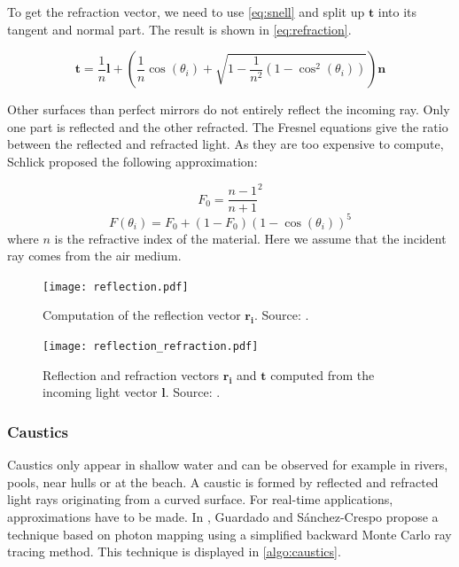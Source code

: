 To get the refraction vector, we need to use \autoref{eq:snell} and split up
$\textbf{t}$ into its tangent and normal part. The result is shown in
\autoref{eq:refraction}.

\begin{equation}\label{eq:refraction}
    \textbf{t} = \frac{1}{n} \textbf{l} +
    \left(\frac{1}{n}\cos(\theta_i) + \sqrt{1 - \frac{1}{n^2} \left(1 -
    \cos^2(\theta_i)\right)}\right) \textbf{n}
\end{equation}

Other surfaces than perfect mirrors do not entirely reflect the incoming ray.
Only one part is reflected and the other refracted. The Fresnel equations give
the ratio between the reflected and refracted light. As they are too expensive
to compute, Schlick proposed the following approximation:

\begin{equation}\label{eq:schlick_cst}
    F_0 = \frac{n - 1}{n + 1}^2
\end{equation}
\begin{equation}\label{eq:schlick}
    F(\theta_i) = F_0 + (1 - F_0) {(1 - \cos(\theta_i))}^5
\end{equation}
%
where $n$ is the refractive index of the material. Here we assume that the
incident ray comes from the air medium.

\begin{figure}[hbt]
    \centering
    \texttt{[image: reflection.pdf]}
    \caption{Computation of the reflection vector $\boldsymbol{r_i}$. Source:
    \autocite{RTR3}.}\label{fig:reflection}
\end{figure}

\begin{figure}[hbt]
    \centering
    \texttt{[image: reflection\_refraction.pdf]}
    \caption{Reflection and refraction vectors $\boldsymbol{r_i}$ and
    $\boldsymbol{t}$ computed from the incoming light vector $\boldsymbol{l}$.
    Source: \autocite{RTR3}.}\label{fig:reflection_refraction}
\end{figure}

\subsubsection{Caustics}\label{subsub:caustics}

Caustics only appear in shallow water and can be observed for example in rivers,
pools, near hulls or at the beach. A caustic is formed by reflected and
refracted light rays originating from a curved surface. For real-time
applications, approximations have to be made. In
\autocite[Chapter~2]{fernando2004gpu}, Guardado and Sánchez-Crespo propose a
technique based on photon mapping using a simplified backward Monte Carlo ray
tracing method. This technique is displayed in \autoref{algo:caustics}.

